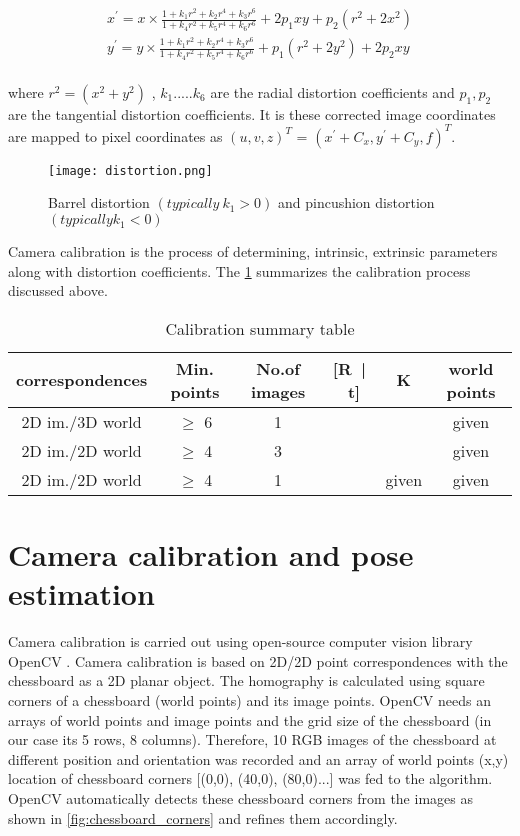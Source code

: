 \begin{equation}
\begin{split}
x^{'} = x \times \frac{1+k_1r^2+k_2r^4+k_3r^6}{1+k_4r^2+k_5r^4+k_6r^6} + 2p_1xy + p_2(r^2+2x^2)\\
y^{'} = y \times \frac{1+k_1r^2+k_2r^4+k_3r^6}{1+k_4r^2+k_5r^4+k_6r^6} + p_1(r^2+2y^2) + 2p_2xy\\ 
\end{split}	
\label{eq:lens_distortion}
\end{equation}

\noindent where $ r^2 = (x^2+y^2) $ , $ k_1 .....k_6 $ are the radial distortion coefficients and  $ p_1, p_2 $ are the tangential distortion coefficients. It is these corrected image coordinates are mapped to pixel coordinates as \( (u, v, z)^T \) = \( ( x^{'} +C_x, y^{'} +C_y, \textit{f} )^T \).

\begin{figure}[hbt!]
	\centering
	\texttt{[image: distortion.png]}
	\caption{Barrel distortion $(typically \ k_1 > 0 )$ and pincushion distortion $(typically k_1 < 0)$ \cite{OpenCV}} 
	\label{fig:distortion}
\end{figure}
\newpage
Camera calibration is the process of determining, intrinsic, extrinsic parameters along with distortion coefficients. The \cref{tab:Calibration_summary_table} summarizes the calibration process discussed above. 

\begin{table}[hbt!]
	\centering
	\begin{tabular}{|cccccc|}
		\hline
		correspondences & Min. points & No.of images & [R\ |\ t] & K & world points\\ 
		\hline
		2D im./3D world & $\geq$ 6 & 1 & \checkmark & \checkmark & given \\
		2D im./2D world & $\geq$ 4 & 3 & \checkmark & \checkmark  & given \\
		2D im./2D world & $\geq$ 4 & 1 & \checkmark  & given & given \\
		\hline
	\end{tabular}
	\caption{Calibration summary table}
	\label{tab:Calibration_summary_table}
\end{table}

\section{Camera calibration and pose estimation}
Camera calibration is carried out using open-source computer vision library OpenCV \cite{OpenCV}. Camera calibration is based on 2D/2D point correspondences with the chessboard as a 2D planar object. The homography is calculated using square corners of a chessboard (world points) and its image points. OpenCV needs an arrays of world points and image points and the grid size of the chessboard (in our case its 5 rows, 8 columns). Therefore, 10 RGB images of the chessboard at different position and orientation was recorded and an array of world points (x,y) location of chessboard corners [(0,0), (40,0), (80,0)...] was fed to the algorithm. OpenCV automatically detects these chessboard corners from the images as shown in \cref{fig:chessboard_corners} and refines them accordingly.

